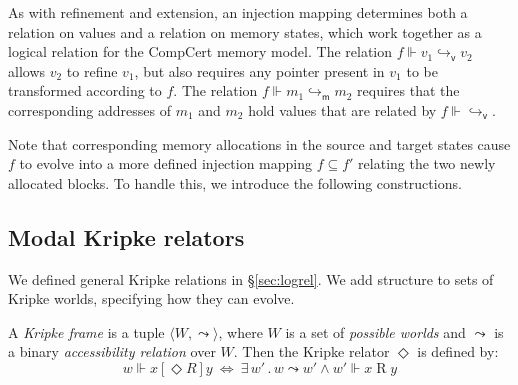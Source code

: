 \documentclass[acmsmall,screen,review,anonymous]{acmart}
\newcommand{\kw}[1]{\ensuremath{ \mathsf{#1} }}
\newcommand{\ifr}[1]{\mathrel{[{#1}]}}
\begin{document}
As with refinement and extension,
an injection mapping determines both
a relation on values and
a relation on memory states,
which work together
as a logical relation for the CompCert memory model.
The relation $f \Vdash v_1 \hookrightarrow_\kw{v} v_2$
allows $v_2$ to refine $v_1$,
but also requires any pointer present in $v_1$ 
to be transformed according to $f$.
The relation $f \Vdash m_1 \hookrightarrow_\kw{m} m_2$
requires that the corresponding addresses of $m_1$ and $m_2$
hold values that are related by $f \Vdash {\hookrightarrow_\kw{v}}$.

Note that corresponding memory allocations
in the source and target states cause $f$ to
evolve into a more defined injection mapping $f \subseteq f'$
relating the two newly allocated blocks.
To handle this,
we introduce the following constructions.


\subsection{Modal Kripke relators} %

We defined general Kripke relations in \S\ref{sec:logrel}.
We add structure to sets of Kripke worlds,
specifying how they can evolve.

\begin{definition} %
A \emph{Kripke frame} is a tuple
$\langle W, {\leadsto} \rangle$, where
$W$ is a set of \emph{possible worlds} and
$\leadsto$ is a
binary \emph{accessibility relation} over $W$.
Then the Kripke relator $\Diamond$ is defined by:
\[
  w \Vdash x \ifr{\Diamond R} y \: \Leftrightarrow \:
    \exists \, w' \,.\, w \leadsto w' \wedge
      w' \Vdash x \mathrel{R} y
\]
\end{definition}
\end{document}
